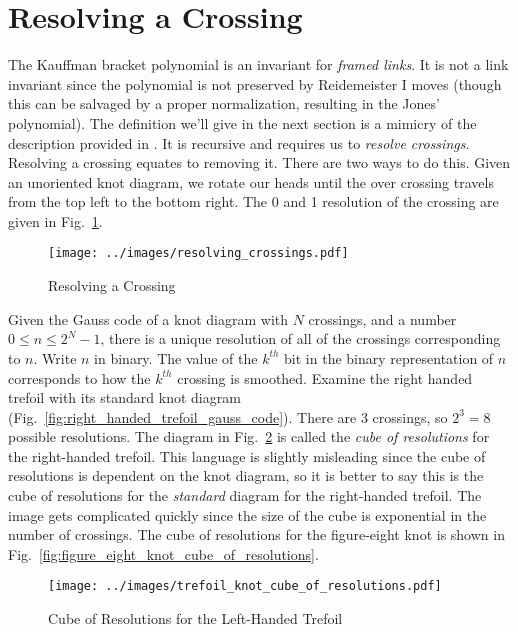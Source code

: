 \documentclass{article}
\theoremstyle{plain}
\begin{document}
    \section{Resolving a Crossing}
        The Kauffman bracket polynomial is an invariant for
        \textit{framed links}. It is not a link invariant since the polynomial
        is not preserved by Reidemeister I moves (though this can be salvaged
        by a proper normalization, resulting in the Jones' polynomial). The
        definition we'll give in the next section is a mimicry of the
        description provided in \cite{barnatan2002khovanov}. It is recursive
        and requires us to \textit{resolve crossings}. Resolving a crossing
        equates to removing it. There are two ways to do this.
        Given an unoriented knot diagram, we rotate our heads until
        the over crossing travels from the top left to the bottom right. The
        0 and 1 resolution of the crossing are given in
        Fig.~\ref{fig:resolving_crossing}.
        \begin{figure}
            \centering
            \texttt{[image: ../images/resolving\_crossings.pdf]}
            \caption{Resolving a Crossing}
            \label{fig:resolving_crossing}
        \end{figure}
        Given the Gauss code of a knot diagram with $N$ crossings, and a number
        $0\leq{n}\leq{2}^{N}-1$, there is a unique resolution of all of the
        crossings corresponding to $n$. Write $n$ in binary. The value of the
        $k^{th}$ bit in the binary representation of $n$ corresponds to how the
        $k^{th}$ crossing is smoothed. Examine the right handed trefoil with its
        standard knot diagram (Fig.~\ref{fig:right_handed_trefoil_gauss_code}).
        There are 3 crossings, so $2^{3}=8$ possible resolutions. The diagram
        in Fig.~\ref{fig:trefoil_knot_cube_of_resolutions} is called the
        \textit{cube of resolutions} for the right-handed
        trefoil. This language is slightly misleading since the cube of
        resolutions is dependent on the knot diagram, so it is better to say
        this is the cube of resolutions for the \textit{standard} diagram for
        the right-handed trefoil. The image gets complicated quickly since the
        size of the cube is exponential in the number of crossings. The cube of
        resolutions for the figure-eight knot is shown in
        Fig.~\ref{fig:figure_eight_knot_cube_of_resolutions}.
        \begin{figure}
            \centering
            \texttt{[image: ../images/trefoil\_knot\_cube\_of\_resolutions.pdf]}
            \caption{Cube of Resolutions for the Left-Handed Trefoil}
            \label{fig:trefoil_knot_cube_of_resolutions}
        \end{figure}
\end{document}
